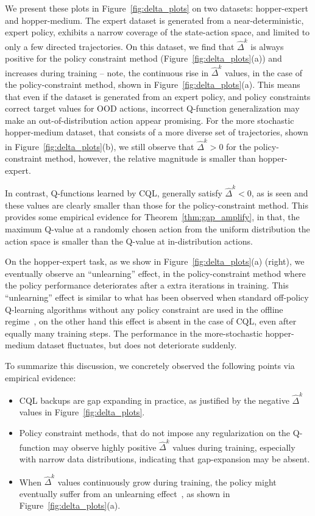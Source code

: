 We present these plots in Figure~\ref{fig:delta_plots} on two datasets: hopper-expert and hopper-medium. The expert dataset is generated from a near-deterministic, expert policy, exhibits a narrow coverage of the state-action space, and limited to only a few directed trajectories. On this dataset, we find that $\hat{\Delta}^k$ is always positive for the policy constraint method (Figure~\ref{fig:delta_plots}(a)) and increases during training -- note, the continuous rise in $\hat{\Delta}^k$ values, in the case of the policy-constraint method, shown in Figure~\ref{fig:delta_plots}(a). This means that even if the dataset is generated from an expert policy, and policy constraints correct target values for OOD actions,
incorrect Q-function generalization may make an out-of-distribution action appear promising. For the more stochastic hopper-medium dataset, that consists of a more diverse set of trajectories, shown in Figure~\ref{fig:delta_plots}(b), we still observe that $\hat{\Delta}^k > 0$ for the policy-constraint method, however, the relative magnitude is smaller than hopper-expert.

In contrast, Q-functions learned by CQL, generally satisfy $\hat{\Delta}^k < 0$, as is seen  and these values are clearly smaller than those for the policy-constraint method. This provides some empirical evidence for Theorem~\ref{thm:gap_amplify}, in that, the maximum Q-value at a randomly chosen action from the uniform distribution the action space is smaller than the Q-value at in-distribution actions.

On the hopper-expert task, as we show in Figure~\ref{fig:delta_plots}(a) (right), we eventually observe an ``unlearning'' effect, in the policy-constraint method where the policy performance deteriorates after a extra iterations in training. This ``unlearning'' effect is similar to what has been observed when standard off-policy Q-learning algorithms without any policy constraint are used in the offline regime~\citep{kumar2019stabilizing,levine2020offline}, on the other hand this effect is absent in the case of CQL, even after equally many training steps. The performance in the more-stochastic hopper-medium dataset fluctuates, but does not deteriorate suddenly.

To summarize this discussion, we concretely observed the following points via empirical evidence:
\begin{itemize}
\vspace{-10pt}
    \item CQL backups are gap expanding in practice, as justified by the negative $\hat{\Delta}^k$ values in Figure~\ref{fig:delta_plots}.
    \item Policy constraint methods, that do not impose any regularization on the Q-function may observe highly positive $\hat{\Delta}^k$ values during training, especially with narrow data distributions, indicating that gap-expansion may  be absent.
    \item When $\hat{\Delta}^k$ values continuously grow during training, the policy might eventually suffer from an unlearning effect~\citep{levine2020offline}, as shown in Figure~\ref{fig:delta_plots}(a).
    \vspace{-10pt}
\end{itemize}

